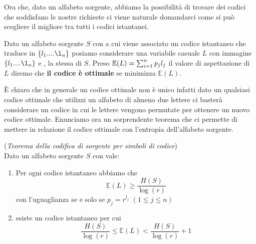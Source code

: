 Ora che, dato un alfabeto sorgente, abbiamo la possibilità di trovare dei codici che soddisfano le nostre richieste ci viene naturale domandarci come si può scegliere il migliore tra tutti i codici istantanei.

\begin{defi}
Dato un alfabeto sorgente $S$ \va con \lep a cui viene associato un codice istantaneo che traduce \va in $\{ l_1....\l_n \}$ posiamo considerare una variabile casuale $L$ con immagine $\{ l_1....\l_n \}$ e \lep , la stessa di $S$. Preso $\mathbb{E}(L)=\sum_{i=1}^n p_j l_j$ il valore di aspettazione di $L$ diremo che \textbf{il codice è ottimale} se minimizza $\mathbb{E}(L)$.
\end{defi}
È chiaro che in generale un codice ottimale non è unico infatti dato un qualsiasi codice ottimale che utilizzi un alfabeto di almeno due lettere ci basterà considerare un codice in cui le lettere vengono permutate per ottenere un nuovo codice ottimale.
Enunciamo ora un sorprendente teorema che ci permette di mettere in relazione il codice ottimale con l'entropia dell'alfabeto sorgente.
 
\begin{teo}(\textit{Teorema della codifica di sorgente per simboli di codice})\\
Dato un alfabeto sorgente $S$ con \lep vale:
\begin{enumerate}
\item Per ogni codice istantaneo abbiamo che
\begin{equation}
\mathbb{E}(L)\geq \frac{H(S)}{\log (r)}
\end{equation}
con l'uguaglianza se e solo se $p_j=r^{l_j}$ $(1 \leq j \leq n)$
\item esiste un codice istantaneo per cui
\begin{equation}
\frac{H(S)}{\log (r)} \leq \mathbb{E}(L) < \frac{H(S)}{\log (r)} +1
\end{equation}
\end{enumerate}
\end{teo}

